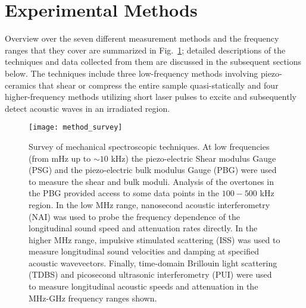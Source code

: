 \documentclass[reprint,showpacs,amsmath,amssymb,aip,jcp]{revtex4-1}
\begin{document}



\maketitle
\setcounter{equation}{0}
\setcounter{figure}{0}
\setcounter{table}{0}
\setcounter{page}{1}
\makeatletter
\renewcommand{\theequation}{S\arabic{equation}}
\renewcommand{\thefigure}{S\arabic{figure}}
\renewcommand{\bibnumfmt}[1]{[S#1]}
\renewcommand{\citenumfont}[1]{S#1}

\section{Experimental Methods}

Overview over the seven different measurement methods and the
frequency ranges that they cover are summarized in
Fig.~\ref{fig:techniques_survey}; detailed descriptions of the
techniques and data collected from them are discussed in the
subsequent sections below. The techniques include three low-frequency
methods involving piezo-ceramics that shear or compress the entire
sample quasi-statically\cite{sHecksher2013, sChristensen1994b,
  sChristensen1995, sHecksher_thesis} and four higher-frequency methods
utilizing short laser pulses to excite and subsequently detect
acoustic waves in an irradiated region\cite{sJohnson_thesis, sYan1987b,
  sSilence1992, sTorchinsky_thesis, sThomsen1986, sKlieber_thesis,
  sChoi2005}.

\begin{figure}[h!]
  \centering
  \texttt{[image: method\_survey]}
  \caption{\label{fig:techniques_survey}Survey of mechanical
    spectroscopic techniques. At low frequencies (from mHz up to
    $\sim10$ kHz) the piezo-electric Shear modulus Gauge (PSG) and the
    piezo-electric bulk modulus Gauge (PBG) were used to measure the
    shear and bulk moduli. Analysis of the overtones in the PBG
    provided access to some data points in the $100-500$ kHz
    region. In the low MHz range, nanosecond acoustic interferometry
    (NAI) was used to probe the frequency dependence of the
    longitudinal sound speed and attenuation rates directly. In the
    higher MHz range, impulsive stimulated scattering (ISS) was used
    to measure longitudinal sound velocities and damping at specified
    acoustic wavevectors. Finally, time-domain Brillouin light
    scattering (TDBS) and picosecond ultrasonic interferometry (PUI)
    were used to measure longitudinal acoustic speeds and attenuation
    in the MHz-GHz frequency ranges shown.}
\end{figure}
\end{document}
